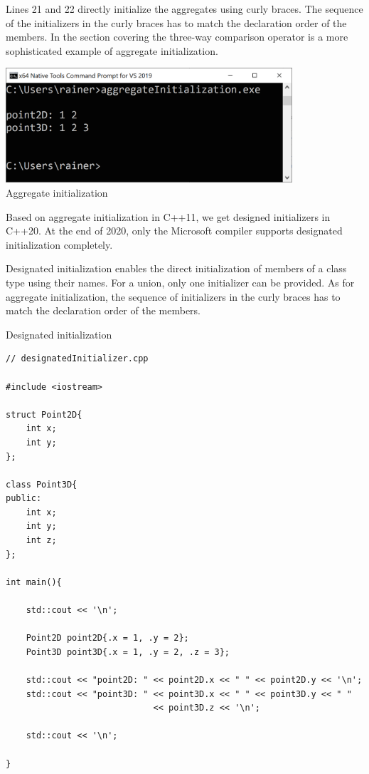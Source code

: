 Lines 21 and 22 directly initialize the aggregates using curly braces. The sequence of the initializers in the curly braces has to match the declaration order of the members. In the section covering the three-way comparison operator is a more sophisticated example of aggregate initialization.

\begin{center}
\includegraphics[width=0.8\textwidth]{content/3/chapter4/images/32.png}\\
Aggregate initialization
\end{center}

Based on aggregate initialization in C++11, we get designed initializers in C++20. At the end of 2020, only the Microsoft compiler supports designated initialization completely.


Designated initialization enables the direct initialization of members of a class type using their names. For a union, only one initializer can be provided. As for aggregate initialization, the sequence of initializers in the curly braces has to match the declaration order of the members.

\noindent
Designated initialization
\begin{lstlisting}[style=styleCXX]
// designatedInitializer.cpp

#include <iostream>

struct Point2D{
	int x;
	int y;
};

class Point3D{
public:
	int x;
	int y;
	int z;
};

int main(){
	
	std::cout << '\n';
	
	Point2D point2D{.x = 1, .y = 2};
	Point3D point3D{.x = 1, .y = 2, .z = 3};
	
	std::cout << "point2D: " << point2D.x << " " << point2D.y << '\n';
	std::cout << "point3D: " << point3D.x << " " << point3D.y << " "
							 << point3D.z << '\n';
	
	std::cout << '\n';
	
}
\end{lstlisting}

